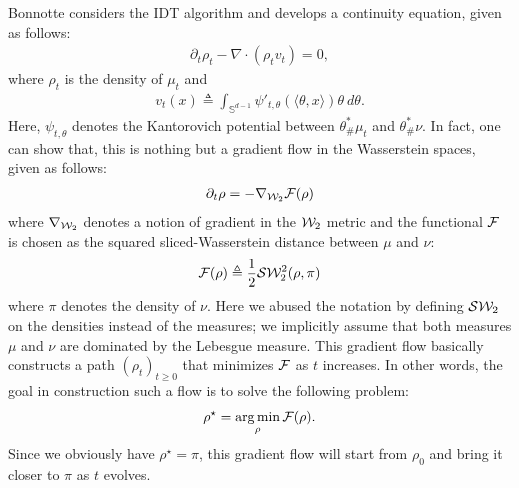 Bonnotte \cite{bonnotte2013unidimensional} considers the IDT algorithm \cite{pitie2005n} and develops a continuity equation, given as follows:
\begin{align}
\partial_t \rho_t - \nabla \cdot (\rho_t v_t) = 0,
\end{align}
where $\rho_t$ is the density of $\mu_t$ and
\begin{align}
v_t(x) \triangleq \int_{\mathbb{S}^{d-1}} \psi'_{t,\theta}(\langle \theta, x \rangle) \theta \> d\theta. \label{eqn:idt_v}
\end{align}
Here, $\psi_{t,\theta}$ denotes the Kantorovich potential between $\theta^*_{\#}\mu_t$ and $\theta^*_{\#}\nu$. In fact, one can show that, this is nothing but a gradient flow in the Wasserstein spaces, given as follows:
\begin{align}
\partial_t \rho = - \nabla_{{\cal W}_2} {\cal F}(\rho) \label{eqn:gradflow}
\end{align}
where $\nabla_{{\cal W}_2}$ denotes a notion of gradient in the ${\cal W}_2$ metric and the functional ${\cal F}$ is chosen as the squared sliced-Wasserstein distance between $\mu$ and $\nu$:
\begin{align}
{\cal F}(\rho) \triangleq \frac1{2} {\cal S}{\cal W}_2^2(\rho, \pi)
\end{align}
where $\pi$ denotes the density of $\nu$. Here we abused the notation by defining ${\cal S}{\cal W}_2$ on the densities instead of the measures; we implicitly assume that both measures $\mu$ and $\nu$ are dominated by the Lebesgue measure. This gradient flow basically constructs a path $(\rho_t)_{t\geq 0}$ that minimizes ${\cal F}$ as $t$ increases. In other words, the goal in construction such a flow is to solve the following problem:
\begin{align}
\rho^\star = \operatorname*{arg\min}_\rho {\cal F}(\rho).
\end{align}
Since we obviously have $\rho^\star = \pi$, this gradient flow will start from $\rho_0$ and bring it closer to $\pi$ as $t$ evolves.


